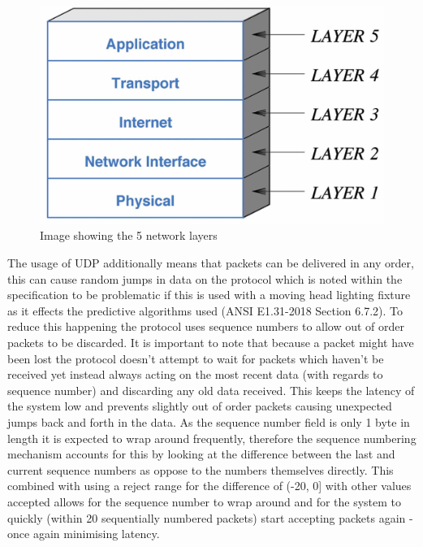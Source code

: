 \documentclass[11pt,a4paper]{article}
\begin{document}
\begin{figure}[H]
\label{NET_STACK}
\includegraphics[width=\textwidth]{net_stack}
\caption{Image showing the 5 network layers}
\end{figure}

The usage of UDP additionally means that packets can be delivered in any order, this can cause random jumps in data on the protocol which is noted within the specification to be problematic if this is used with a moving head lighting fixture as it effects the predictive algorithms used (ANSI E1.31-2018 Section 6.7.2). To reduce this happening the protocol uses sequence numbers to allow out of order packets to be discarded. It is important to note that because a packet might have been lost the protocol doesn't attempt to wait for packets which haven't be received yet instead always acting on the most recent data (with regards to sequence number) and discarding any old data received. This keeps the latency of the system low and prevents slightly out of order packets causing unexpected jumps back and forth in the data. As the sequence number field is only 1 byte in length it is expected to wrap around frequently, therefore the sequence numbering mechanism accounts for this by looking at the difference between the last and current sequence numbers as oppose to the numbers themselves directly. This combined with using a reject range for the difference of (-20, 0] with other values accepted allows for the sequence number to wrap around and for the system to quickly (within 20 sequentially numbered packets) start accepting packets again - once again minimising latency. 
\end{document}
